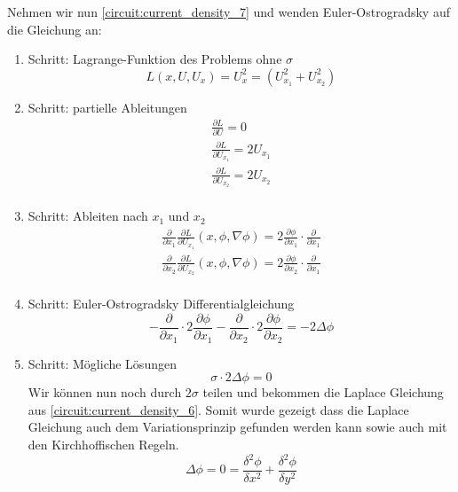 Nehmen wir nun \autoref{circuit:current_density_7} und wenden Euler-Ostrogradsky auf die Gleichung an:
\begin{enumerate}
	\item Schritt: Lagrange-Funktion des Problems ohne $\sigma$
	\begin{equation}
		L(x, U, U_x)= U_x^2 = \left(U_{x_1}^2+U_{x_2}^2\right)
	\end{equation}
	\item Schritt: partielle Ableitungen
	\begin{equation}
		\begin{aligned}
			\frac{\partial L}{\partial U}=0\\
			\frac{\partial L}{\partial U_{x_1}}=2U_{x_1}\\
			\frac{\partial L}{\partial U_{x_2}}=2U_{x_2}\\
		\end{aligned}
	\end{equation}
	\item Schritt: Ableiten nach $x_1$ und $x_2$
	\begin{equation}
		\begin{aligned}
			\frac{\partial}{\partial x_1}\frac{\partial L}{\partial U_{x_1}}(x,\phi,\nabla \phi)=2\frac{\partial \phi}{\partial {x_1}}\cdot \frac{\partial}{\partial x_1}\\
			\frac{\partial}{\partial x_2}\frac{\partial L}{\partial U_{x_2}}(x,\phi,\nabla \phi)=2\frac{\partial \phi}{\partial {x_2}} \cdot \frac{\partial}{\partial x_1}\\
		\end{aligned}
	\end{equation}
	\item Schritt: Euler-Ostrogradsky Differentialgleichung
	\begin{equation}
		-\frac{\partial}{\partial x_1}\cdot 2\frac{\partial \phi}{\partial {x_1}}-\frac{\partial}{\partial x_2}\cdot 2\frac{\partial \phi}{\partial {x_2}}=-2\Delta\phi
	\end{equation}
	\item Schritt: Mögliche Lösungen
	\begin{equation}
	\sigma \cdot 2\Delta\phi=0
	\end{equation}
Wir können nun noch durch $2\sigma$ teilen und bekommen die Laplace Gleichung aus \autoref{circuit:current_density_6}. Somit wurde gezeigt dass die Laplace Gleichung auch dem Variationsprinzip gefunden werden kann sowie auch mit den Kirchhoffischen Regeln.
	\begin{equation}
	\Delta\phi=0=\frac{\delta^2\phi}{\delta x^2}+\frac{\delta^2\phi}{\delta y^2}
	\label{circuit:laplace1}
	\end{equation}
\end{enumerate}

